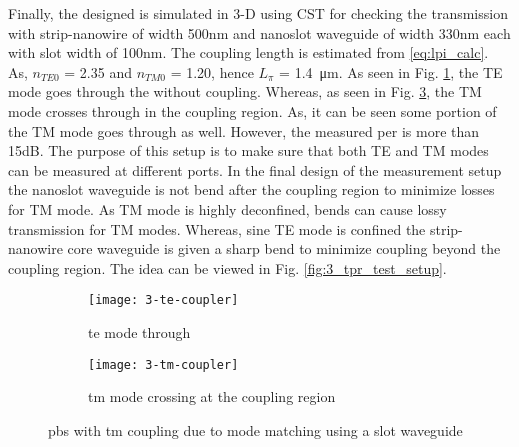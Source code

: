\documentclass[../report.tex]{subfiles}
\begin{document}
\noindent Finally, the designed is simulated in 3-D using CST for checking the transmission with strip-nanowire of width 500nm and nanoslot waveguide of width 330nm each with slot width of 100nm. The coupling length is estimated from \ref{eq:lpi_calc}. As, $n_{TE0}$ = 2.35 and $n_{TM0}$ = 1.20, hence $L_{\pi}$ = \SI{1.4}{\micro\meter}. As seen in Fig. \ref{fig:3_te_coupler}, the TE mode goes through the without coupling. Whereas, as seen in Fig. \ref{fig:3_tm_coupler}, the TM mode crosses through in the coupling region. As, it can be seen some portion of the TM mode goes through as well. However, the measured \gls{per} is more than 15dB. The purpose of this setup is to make sure that both TE and TM modes can be measured at different ports. In the final design of the measurement setup the nanoslot waveguide is not bend after the coupling region to minimize losses for TM mode. As TM mode is highly deconfined, bends can cause lossy transmission for TM modes. Whereas, sine TE mode is confined the strip-nanowire core waveguide is given a sharp bend to minimize coupling beyond the coupling region. The idea can be viewed in Fig. \ref{fig:3_tpr_test_setup}.

\begin{figure}[H] %
	\begin{subfigure}[t]{0.45\textwidth}
		\texttt{[image: 3-te-coupler]}
		\caption{\gls{te} mode through}
		\label{fig:3_te_coupler}
	\end{subfigure}
	\hfill
	\begin{subfigure}[t]{0.45\textwidth}
		\texttt{[image: 3-tm-coupler]}
		\caption{\gls{tm} mode crossing at the coupling region}
		\label{fig:3_tm_coupler}
	\end{subfigure}
	\caption{\gls{pbs} with \gls{tm} coupling due to mode matching using a slot waveguide}
\end{figure}
\end{document}
